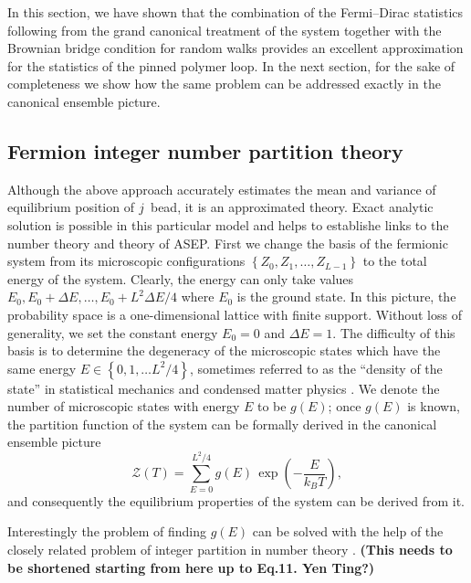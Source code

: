 \documentclass[aps,showpacs,twocolumn,floatfix,prx,superscriptaddress]{revtex4-1}
\begin{document}
In this section, we have shown that the combination of the Fermi--Dirac statistics following from the grand canonical treatment of the system together with the Brownian bridge condition for random walks provides an excellent approximation for the statistics of the pinned polymer loop. In the next section, for the sake of completeness we show how the same problem can be addressed exactly in the canonical ensemble picture.

\subsection{Fermion integer number partition theory}
Although the above approach accurately estimates the mean and variance of equilibrium position of $j^{\rm}$ bead, it is an approximated theory. Exact analytic solution is possible in this particular model and helps to establishe links to the number theory and theory of ASEP. First we change the basis of the fermionic system from its microscopic configurations $\left\{Z_0,Z_1,\ldots,Z_{L-1}\right\}$ to the total energy of the system. Clearly, the energy can only take values $E_0, E_0+\Delta E, \ldots, E_0 + L^2 \Delta E / 4$ where $E_0$ is the ground state. In this picture, the probability space is a one-dimensional lattice with finite support. Without loss of generality, we set the constant energy $E_0=0$ and $\Delta E=1$. The difficulty of this basis is to determine the degeneracy of the microscopic states which have the same energy $E \in \left\{0,1,\ldots L^2/4\right\}$, sometimes referred to as the ``density of the state'' in statistical mechanics \cite{huang1987statistical} and condensed matter physics \cite{sander2009advanced}. We denote the number of microscopic states with energy $E$ to be $g(E)$; once $g(E)$ is known, the partition function of the system can be formally derived in the canonical ensemble picture
\begin{equation}
\mathcal{Z}\left(T\right) = \sum_{E=0}^{L^2/4} g(E) \, \exp \left(-\frac{E}{k_B T}\right),
\label{eq:par_func}
\end{equation}
and consequently the equilibrium properties of the system can be derived from it. 

Interestingly the problem of finding $g(E)$ can be solved with the help of the closely related problem of integer partition in number theory \cite{andrews1998theory}. 
{\bf(This needs to be shortened starting from here up to Eq.11. Yen Ting?)}
\end{document}
